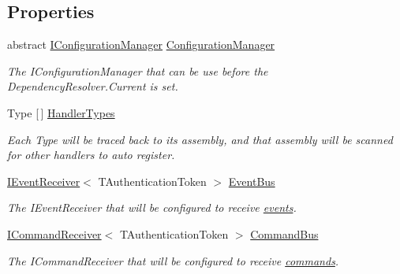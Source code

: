 \subsection*{Properties}
\begin{DoxyCompactItemize}
\item 
abstract \hyperlink{interfaceCqrs_1_1Configuration_1_1IConfigurationManager}{I\+Configuration\+Manager} \hyperlink{classCqrs_1_1Hosts_1_1CoreHost_a768172344b47e2011878cf22466b18e3_a768172344b47e2011878cf22466b18e3}{Configuration\+Manager}
\begin{DoxyCompactList}\small\item\em The I\+Configuration\+Manager that can be use before the Dependency\+Resolver.\+Current is set. \end{DoxyCompactList}\item 
Type \mbox{[}$\,$\mbox{]} \hyperlink{classCqrs_1_1Hosts_1_1CoreHost_a7bfb4acd3b84a95d341b57cc28388023_a7bfb4acd3b84a95d341b57cc28388023}{Handler\+Types}
\begin{DoxyCompactList}\small\item\em Each Type will be traced back to it\textquotesingle{}s assembly, and that assembly will be scanned for other handlers to auto register. \end{DoxyCompactList}\item 
\hyperlink{interfaceCqrs_1_1Events_1_1IEventReceiver}{I\+Event\+Receiver}$<$ T\+Authentication\+Token $>$ \hyperlink{classCqrs_1_1Hosts_1_1CoreHost_a43800973db69575a947f16c9f3e12c8b_a43800973db69575a947f16c9f3e12c8b}{Event\+Bus}
\begin{DoxyCompactList}\small\item\em The I\+Event\+Receiver that will be configured to receive \hyperlink{}{events}. \end{DoxyCompactList}\item 
\hyperlink{interfaceCqrs_1_1Commands_1_1ICommandReceiver}{I\+Command\+Receiver}$<$ T\+Authentication\+Token $>$ \hyperlink{classCqrs_1_1Hosts_1_1CoreHost_a3d9121f200c8bb6b1cfe1d93ae96461e_a3d9121f200c8bb6b1cfe1d93ae96461e}{Command\+Bus}
\begin{DoxyCompactList}\small\item\em The I\+Command\+Receiver that will be configured to receive \hyperlink{}{commands}. \end{DoxyCompactList}\item 

\end{DoxyCompactItemize}
